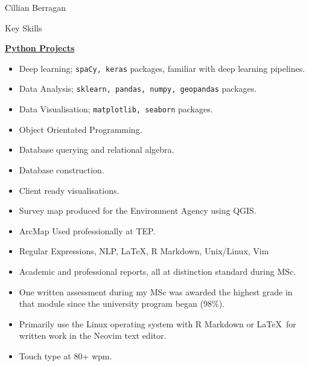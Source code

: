 \documentclass{scrartcl}
\begin{document}
\begin{cv}{Cillian Berragan}
\begin{cvlist}{Key Skills}
\vspace{5mm}
\item[\textbf{Python:}]\href{https://cjber.github.io/tags/python/}{\textbf{Python Projects}}
\begin{itemize}\item Deep learning; \texttt{spaCy, keras} packages, familiar with deep learning pipelines. 
\item Data Analysis; \texttt{sklearn, pandas, numpy, geopandas} packages.
\item Data Visualisation; \texttt{matplotlib, seaborn} packages.
\item Object Orientated Programming.
\end{itemize}
\vspace{5mm}
\item[\textbf{SQL:}]\begin{itemize}\item Database querying and relational algebra.
\item Database construction.
\vspace{5mm}
\end{itemize}
\item[\textbf{QGIS \& ArcGIS:}]\begin{itemize}\item Client ready visualisations.
\item Survey map produced for the Environment Agency using QGIS.
\item ArcMap Used professionally at TEP.
\vspace{5mm}
\item[\textbf{Additional Skills}:] Regular Expressions, NLP, \LaTeX, R Markdown, Unix/Linux, Vim 
\end{itemize}
\vspace{5mm}
\item[\textbf{Written work:}]\begin{itemize}\item Academic and professional reports, all at distinction standard during MSc.
\item One written assessment during my MSc was awarded the highest grade in that module since the university program began (98\%).
\item Primarily use the Linux operating system with R Markdown or \LaTeX\ for written work in the Neovim text editor.
\item Touch type at 80+ wpm.
\end{itemize}
\end{cvlist}


\end{cv}
\end{document}
